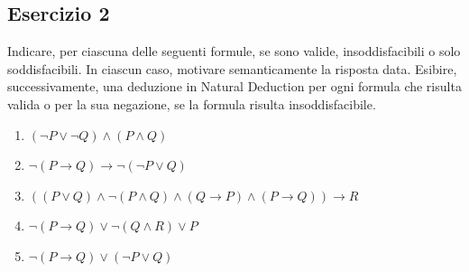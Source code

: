 \subsection*{Esercizio 2}

Indicare, per ciascuna delle seguenti formule, se sono valide, insoddisfacibili o solo soddisfacibili. In ciascun caso, motivare semanticamente la risposta data. Esibire, successivamente, una deduzione in Natural Deduction per ogni formula che risulta valida o per la sua negazione, se la formula risulta insoddisfacibile.
\begin{enumerate}
    \item[(a)] \((\neg P\vee\neg Q)\wedge(P\wedge Q)\)
    \item[(b)] \(\neg(P\rightarrow Q)\rightarrow\neg(\neg P\vee Q)\)
    \item[(c)] \(((P\vee Q)\wedge\neg(P\wedge Q)\wedge(Q\rightarrow P)\wedge(P\rightarrow Q))\rightarrow R\)
    \item[(d)] \(\neg(P\rightarrow Q)\vee\neg(Q\wedge R)\vee P\)
    \item[(e)] \(\neg(P\rightarrow Q)\vee(\neg P\vee Q)\)
\end{enumerate}


